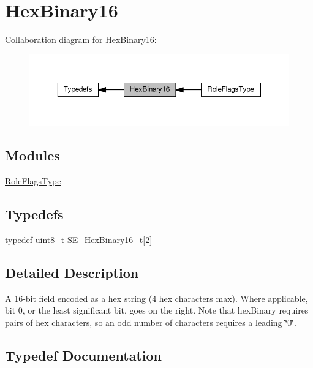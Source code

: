 \hypertarget{group__HexBinary16}{}\section{Hex\+Binary16}
\label{group__HexBinary16}
Collaboration diagram for Hex\+Binary16\+:\nopagebreak
\begin{figure}[H]
\begin{center}
\leavevmode
\includegraphics[width=350pt]{group__HexBinary16}
\end{center}
\end{figure}
\subsection*{Modules}
\begin{DoxyCompactItemize}
\item 
\hyperlink{group__RoleFlagsType}{Role\+Flags\+Type}
\end{DoxyCompactItemize}
\subsection*{Typedefs}
\begin{DoxyCompactItemize}
\item 
typedef uint8\+\_\+t \hyperlink{group__HexBinary16_gac040be0e918a360be6bcf5e8b8ad2c49}{S\+E\+\_\+\+Hex\+Binary16\+\_\+t}\mbox{[}2\mbox{]}
\end{DoxyCompactItemize}


\subsection{Detailed Description}
A 16-\/bit field encoded as a hex string (4 hex characters max). Where applicable, bit 0, or the least significant bit, goes on the right. Note that hex\+Binary requires pairs of hex characters, so an odd number of characters requires a leading \char`\"{}0\char`\"{}. 

\subsection{Typedef Documentation}
\mbox{\label{group__HexBinary16_gac040be0e918a360be6bcf5e8b8ad2c49}} 
